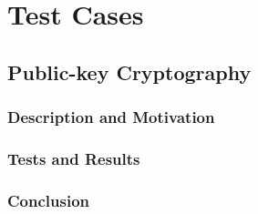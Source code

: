 \chapter{Test Cases}





\section{Public-key Cryptography}
\subsection{Description and Motivation}
\subsection{Tests and Results}
\subsection{Conclusion}
